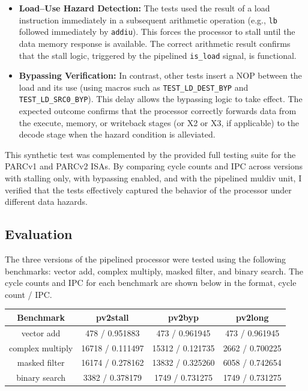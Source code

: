 \documentclass[12pt]{article}
\begin{document}
\begin{itemize} 
    \item \textbf{Load–Use Hazard Detection:} The tests
    used the result of a load instruction immediately in a
    subsequent arithmetic operation (e.g., \texttt{lb} followed immediately 
    by \texttt{addiu}). This forces the processor to stall until the data
    memory response is available. The correct arithmetic result confirms that
    the stall logic, triggered by the pipelined \texttt{is\_load} signal, is
    functional. 
\item \textbf{Bypassing Verification:} In
    contrast, other tests insert a NOP between the load and its use (using
    macros such as \texttt{TEST\_LD\_DEST\_BYP} and
    \texttt{TEST\_LD\_SRC0\_BYP}). This delay allows the bypassing logic to
    take effect. The expected outcome confirms that the processor correctly
    forwards data from the execute, memory, or writeback stages (or X2 or X3, if applicable) to the decode
    stage when the hazard condition is alleviated. 
\end{itemize}

This synthetic test was complemented by the provided full testing suite for the PARCv1 and PARCv2 ISAs.
By comparing cycle counts and IPC across versions with stalling only, with bypassing enabled, and with the pipelined muldiv unit,
I verified that the tests effectively captured the behavior of the
processor under different data hazards.


\subsection*{Evaluation}

The three versions of the pipelined processor were tested using the following
benchmarks: vector add, complex multiply, masked filter, and binary search. The
cycle counts and IPC for each benchmark are shown below in the format, cycle
count / IPC.

\begin{center}
    \begin{tabular}{|c || c | c | c|} 
 \hline
 Benchmark & pv2stall & pv2byp & pv2long \\
 \hline\hline
 vector add & 478 / 0.951883 & 473 / 0.961945 & 473 / 0.961945 \\
 \hline
 complex multiply & 16718 / 0.111497 & 15312 / 0.121735 & 2662 / 0.700225 \\
 \hline
 masked filter & 16174 / 0.278162 & 13832 / 0.325260 & 6058 / 0.742654 \\
 \hline
 binary search & 3382 / 0.378179 & 1749 / 0.731275 & 1749 / 0.731275 \\
 \hline

 \hline

\end{tabular}
\end{center}
\end{document}
